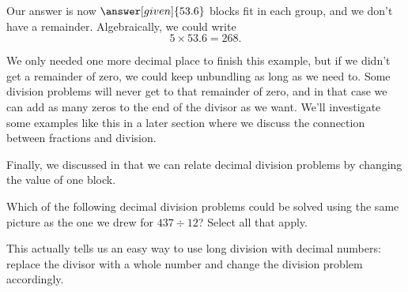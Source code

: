 \documentclass{ximera}
\begin{document}
\begin{example}
\begin{image}
\end{image}

Our answer is now $\answer[given]{53.6}$ blocks fit in each group, and we don't have a remainder. Algebraically, we could write
\[
5 \times 53.6 = 268.
\]

\end{example}

We only needed one more decimal place to finish this example, but if we didn't get a remainder of zero, we could keep unbundling as long as we need to. Some division problems will never get to that remainder of zero, and in that case we can add as many zeros to the end of the divisor as we want. We'll investigate some examples like this in a later section where we discuss the connection between fractions and division.

Finally, we discussed in  that we can relate decimal division problems by changing the value of one block.
\begin{question}
Which of the following decimal division problems could be solved using the same picture as the one we drew for $437 \div 12$? Select all that apply.
\begin{selectAll}
\end{selectAll}
\end{question}

This actually tells us an easy way to use long division with decimal numbers: replace the divisor with a whole number and change the division problem accordingly. 
\end{document}
